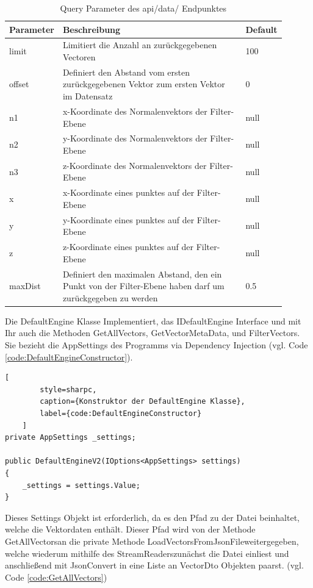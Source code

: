 \begin{table}
	\centering
	\begin{tabular}[h]{p{0.11\linewidth} | p{0.7\linewidth}| p{0.09\linewidth}}
	Parameter & Beschreibung & Default \\
	\hline
	limit & Limitiert die Anzahl an zurückgegebenen Vectoren & 100\\
	offset & Definiert den Abstand vom ersten zurückgegebenen Vektor zum ersten Vektor im Datensatz & 0\\
	n1 & x-Koordinate des Normalenvektors der Filter-Ebene & null\\
	n2 & y-Koordinate des Normalenvektors der Filter-Ebene & null\\
	n3 & z-Koordinate des Normalenvektors der Filter-Ebene & null\\
	x & x-Koordinate eines punktes auf der Filter-Ebene & null\\
	y & y-Koordinate eines punktes auf der Filter-Ebene & null\\
	z & z-Koordinate eines punktes auf der Filter-Ebene & null\\
	maxDist & Definiert den maximalen Abstand, den ein Punkt von der Filter-Ebene haben darf um zurückgegeben zu werden & 0.5\\
	\end{tabular}
	\caption{Query Parameter des api/data/ Endpunktes}
	\label{tab:EndpointQueryParameters}
\end{table}

Die DefaultEngine Klasse Implementiert, das IDefaultEngine Interface
und mit Ihr auch die Methoden GetAllVectors, GetVectorMetaData,
und FilterVectors. Sie bezieht die AppSettings des Programms via
Dependency Injection (vgl. Code \ref{code:DefaultEngineConstructor}).

\begin{codeblock}
	\begin{lstlisting}[
		style=sharpc,
		caption={Konstruktor der DefaultEngine Klasse},
		label={code:DefaultEngineConstructor}
	]
private AppSettings _settings;

public DefaultEngineV2(IOptions<AppSettings> settings)
{
	_settings = settings.Value;
}
	\end{lstlisting}
\end{codeblock}

Dieses Settings Objekt ist erforderlich, da es den Pfad zu der Datei
beinhaltet, welche die Vektordaten enthält. Dieser Pfad wird von der
Methode \grqq GetAllVectors\grqq\space an die private Methode
\grqq LoadVectorsFromJsonFile\grqq\space weitergegeben, welche
wiederum mithilfe des \grqq StreamReaders\grqq\space zunächst die
Datei einliest und anschließend mit \grqq JsonConvert\grqq\space
in eine Liste an VectorDto Objekten paarst.
(vgl. Code \ref{code:GetAllVectors})

